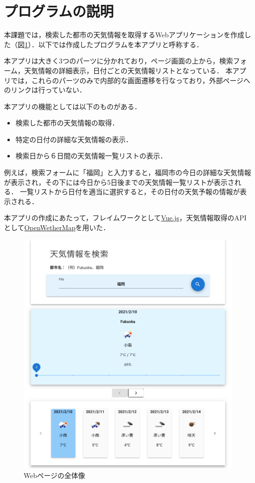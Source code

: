 

\section{プログラムの説明}
本課題では，検索した都市の天気情報を取得するWebアプリケーションを作成した（図\ref{fig:full}）．以下では作成したプログラムを本アプリと呼称する．

本アプリは大きく3つのパーツに分かれており，ページ画面の上から，検索フォーム，天気情報の詳細表示，日付ごとの天気情報リストとなっている．
本アプリでは，これらのパーツのみで内部的な画面遷移を行なっており，外部ページへのリンクは行っていない．

本アプリの機能としては以下のものがある．
\begin{itemize}
\item 検索した都市の天気情報の取得．
\item 特定の日付の詳細な天気情報の表示．
\item 検索日から６日間の天気情報一覧リストの表示．
\end{itemize}

例えば，検索フォームに「福岡」と入力すると，福岡市の今日の詳細な天気情報が表示され，その下には今日から5日後までの天気情報一覧リストが表示される．
一覧リストから日付を適当に選択すると，その日付の天気予報の情報が表示される．

本アプリの作成にあたって，フレイムワークとして\href{https://jp.vuejs.org}{Vue.js}，天気情報取得のAPIとして\href{https://openweathermap.org}{OpenWetherMap}を用いた．

\begin{figure}[htbp]
\centering
\includegraphics[width=15cm]{full1.png}
\caption{Webページの全体像}
\label{fig:full}
\end{figure}


